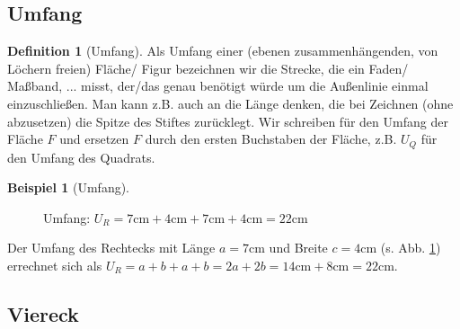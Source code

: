 \documentclass[a4paper]{book}%
\theoremstyle{definition}
\newtheorem{definition}{Definition}
\newtheorem{beispiel}{Beispiel}
\begin{document}
\subsection{Umfang}

\begin{definition}[Umfang]
    Als Umfang einer (ebenen zusammenhängenden, von Löchern freien) Fläche/ Figur bezeichnen wir die Strecke, die ein Faden/ Maßband, ... misst, der/das genau benötigt würde um die Außenlinie einmal einzuschließen. Man kann z.B. auch an die Länge denken, die bei Zeichnen (ohne abzusetzen) die Spitze des Stiftes zurücklegt. Wir schreiben  für den Umfang der Fläche $F$ und ersetzen $F$ durch den ersten Buchstaben der Fläche, z.B. $U_Q$ für den Umfang des Quadrats.
\end{definition}

\begin{beispiel}[Umfang]
    \begin{figure}
      \centering
      \caption{Umfang: $U_R=7\text{cm} + 4\text{cm} + 7\text{cm} + 4\text{cm} = 22\text{cm}$}\label{fig:geometrieUmfang1}
    \end{figure}

    Der Umfang des Rechtecks mit Länge $a=7\text{cm}$ und Breite $c=4\text{cm}$ (s. Abb. \ref{fig:geometrieUmfang1}) errechnet sich als $U_R=a+b+a+b=2a+2b=14\text{cm}+8\text{cm}=22\text{cm}$.
\end{beispiel}


\subsection{Viereck}\label{Viereck}
\end{document}
